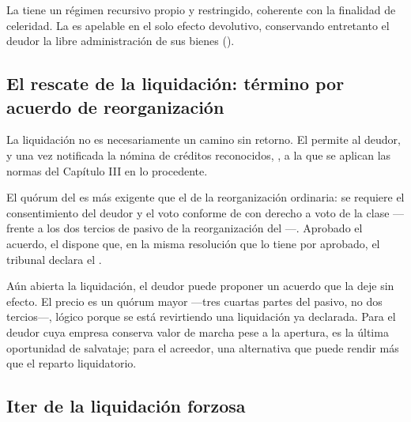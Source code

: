 La  tiene un régimen recursivo propio y restringido,
coherente con la finalidad de celeridad. La  es apelable en
el solo efecto devolutivo, conservando entretanto el deudor la libre administración de sus
bienes ().

\subsection{El rescate de la liquidación: término por acuerdo de reorganización}

La liquidación no es necesariamente un camino sin retorno. El  permite al deudor,
 y una vez notificada la nómina de créditos
reconocidos, , a la que
se aplican las normas del Capítulo III en lo procedente.

El quórum del  es más exigente que el de la reorganización ordinaria: se requiere el
consentimiento del deudor y el voto conforme de  con derecho a voto de la clase ---
frente a los dos tercios de pasivo de la reorganización del ---. Aprobado el acuerdo, el
 dispone que, en la misma resolución que lo tiene por aprobado, el tribunal declara el
.

\begin{foco}
Aún abierta la liquidación, el deudor puede proponer un acuerdo que la deje sin efecto. El
precio es un quórum mayor ---tres cuartas partes del pasivo, no dos tercios---, lógico porque se
está revirtiendo una liquidación ya declarada. Para el deudor cuya empresa conserva valor de
marcha pese a la apertura, es la última oportunidad de salvataje; para el acreedor, una
alternativa que puede rendir más que el reparto liquidatorio.
\end{foco}

\bloquePractico

\subsection{Iter de la liquidación forzosa}


